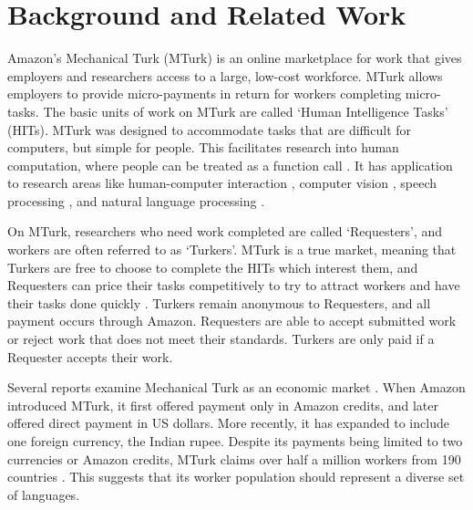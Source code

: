 \documentclass[11pt]{article}
\begin{document}
\section{Background and Related Work}
Amazon's Mechanical Turk (MTurk) is an online marketplace for work that gives employers and researchers access to a large, low-cost workforce. MTurk allows employers to provide micro-payments in return for workers completing micro-tasks.  The basic units of work on MTurk are called `Human Intelligence Tasks' (HITs).  MTurk was designed to accommodate tasks that are difficult for computers, but simple for people. This facilitates research into human computation, where people can be treated as a function call \cite{vonAhnThesis,Little2009,quinn-bederson:2011}.  It has application to research areas like human-computer interaction \cite{bigham-et-al:2010,bernstein-et-al:2010}, computer vision  \cite{sorkin-forsyth:2008,deng-et-al:2010,rashtchian:10}, speech processing \cite{marge:10,lane-EtAl:2010:MTURK,Parent-Eskenazi:2011,Eskenazi:2013:crowdsourcing-speech-book},  and natural language processing \cite{Snow2008,callisonburch-dredze:2010:MTURK,laws-scheible-schutze:2011:EMNLP}. 


\nocite{novotney-callisonburch:2010:NAACLHLT}

On MTurk, researchers who need work completed are called `Requesters', and workers are often referred to as `Turkers'.  MTurk is a true market, meaning that Turkers are free to choose to complete the HITs which interest them, and Requesters can price their tasks competitively to try to attract workers and have their tasks done quickly \cite{faridani-et-al:2011,singer-mittal:2011}. Turkers remain anonymous to Requesters, \nocite{Lease2013}
and all payment occurs through Amazon. Requesters are able to accept submitted work or reject work that does not meet their standards.  Turkers are only paid if a Requester accepts their work. 

Several reports examine Mechanical Turk as an economic market \cite{ipeirotis:2010:marketplace,lehdonvirta-ernkvist:2011}.  When Amazon introduced MTurk, it first offered payment only in Amazon credits, and later offered direct payment in US dollars. More recently, it has expanded to include one foreign currency, the Indian rupee. Despite its payments being limited to two currencies or Amazon credits, MTurk claims over half a million workers from 190 countries \cite{AmazonRequesterTour}.  This suggests that its worker population should represent a diverse set of languages.
\end{document}
